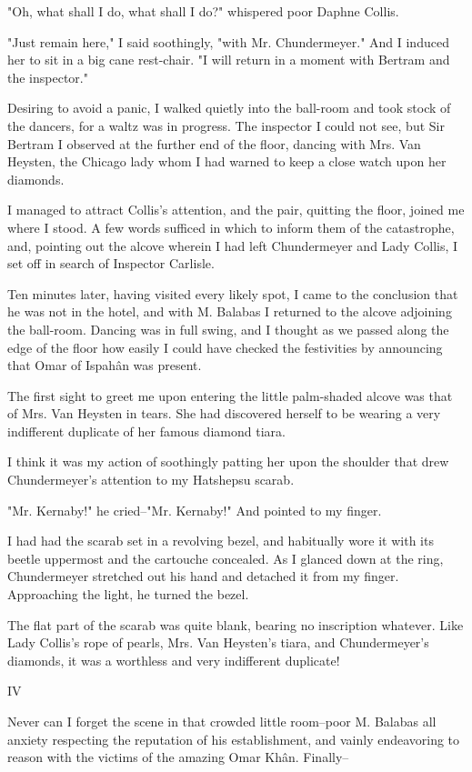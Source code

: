 "Oh, what shall I do, what shall I do?" whispered poor Daphne Collis.

"Just remain here," I said soothingly, "with Mr. Chundermeyer." And I
induced her to sit in a big cane rest-chair. "I will return in a
moment with Bertram and the inspector."

Desiring to avoid a panic, I walked quietly into the ball-room and
took stock of the dancers, for a waltz was in progress. The inspector
I could not see, but Sir Bertram I observed at the further end of the
floor, dancing with Mrs. Van Heysten, the Chicago lady whom I had
warned to keep a close watch upon her diamonds.

I managed to attract Collis's attention, and the pair, quitting the
floor, joined me where I stood. A few words sufficed in which to
inform them of the catastrophe, and, pointing out the alcove wherein
I had left Chundermeyer and Lady Collis, I set off in search of
Inspector Carlisle.

Ten minutes later, having visited every likely spot, I came to the
conclusion that he was not in the hotel, and with M. Balabas I
returned to the alcove adjoining the ball-room. Dancing was in full
swing, and I thought as we passed along the edge of the floor how
easily I could have checked the festivities by announcing that Omar
of Ispahân was present.

The first sight to greet me upon entering the little palm-shaded
alcove was that of Mrs. Van Heysten in tears. She had discovered
herself to be wearing a very indifferent duplicate of her famous
diamond tiara.

I think it was my action of soothingly patting her upon the shoulder
that drew Chundermeyer's attention to my Hatshepsu scarab.

"Mr. Kernaby!" he cried--"Mr. Kernaby!" And pointed to my finger.

I had had the scarab set in a revolving bezel, and habitually wore it
with its beetle uppermost and the cartouche concealed. As I glanced
down at the ring, Chundermeyer stretched out his hand and detached it
from my finger. Approaching the light, he turned the bezel.

The flat part of the scarab was quite blank, bearing no inscription
whatever. Like Lady Collis's rope of pearls, Mrs. Van Heysten's tiara,
and Chundermeyer's diamonds, it was a worthless and very indifferent
duplicate!


IV

Never can I forget the scene in that crowded little room--poor M.
Balabas all anxiety respecting the reputation of his establishment,
and vainly endeavoring to reason with the victims of the amazing Omar
Khân. Finally--

